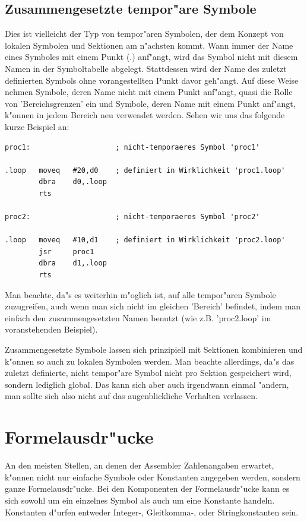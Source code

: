 \documentclass[12pt,a4paper,twoside]{report}
\begin{document}
\subsection{Zusammengesetzte tempor"are Symbole}

Dies ist vielleicht der Typ von tempor"aren Symbolen, der dem Konzept von
lokalen Symbolen und Sektionen am n"achsten kommt.  Wann immer der Name
eines Symboles mit einem Punkt (.) anf"angt, wird das Symbol nicht mit
diesem Namen in der Symboltabelle abgelegt.  Stattdessen wird der Name des
zuletzt definierten Symbols ohne vorangestellten Punkt davor geh"angt.  Auf
diese Weise nehmen Symbole, deren Name nicht mit einem Punkt anf"angt, quasi
die Rolle von 'Bereichsgrenzen' ein und Symbole, deren Name mit einem
Punkt anf"angt, k"onnen in jedem Bereich neu verwendet werden.  Sehen wir
uns das folgende kurze Beispiel an:
\begin{verbatim}
proc1:                    ; nicht-temporaeres Symbol 'proc1'

.loop   moveq   #20,d0    ; definiert in Wirklichkeit 'proc1.loop'
        dbra    d0,.loop
        rts

proc2:                    ; nicht-temporaeres Symbol 'proc2'

.loop   moveq   #10,d1    ; definiert in Wirklichkeit 'proc2.loop'
        jsr     proc1
        dbra    d1,.loop
        rts
\end{verbatim}
Man beachte, da"s es weiterhin m"oglich ist, auf alle tempor"aren Symbole
zuzugreifen, auch wenn man sich nicht im gleichen 'Bereich' befindet,
indem man einfach den zusammengesetzten Namen benutzt (wie z.B.
'proc2.loop' im voranstehenden Beispiel).

Zusammengesetzte Symbole lassen sich prinzipiell mit Sektionen kombinieren
und k"onnen so auch zu lokalen Symbolen werden.  Man beachte allerdings,
da"s das zuletzt definierte, nicht tempor"are Symbol nicht pro Sektion
gespeichert wird, sondern lediglich global.  Das kann sich
aber auch irgendwann einmal "andern, man sollte sich also nicht auf das
augenblickliche Verhalten verlassen.


\section{Formelausdr"ucke}

An den meisten Stellen, an denen der Assembler Zahlenangaben erwartet,
k"onnen nicht nur einfache Symbole oder Konstanten angegeben werden,
sondern ganze Formelausdr"ucke.  Bei den Komponenten der Formelausdr"ucke
kann es sich sowohl um ein einzelnes Symbol als auch um eine Konstante
handeln.  Konstanten d"urfen entweder Integer-, Gleitkomma-, oder
Stringkonstanten sein.
\end{document}
